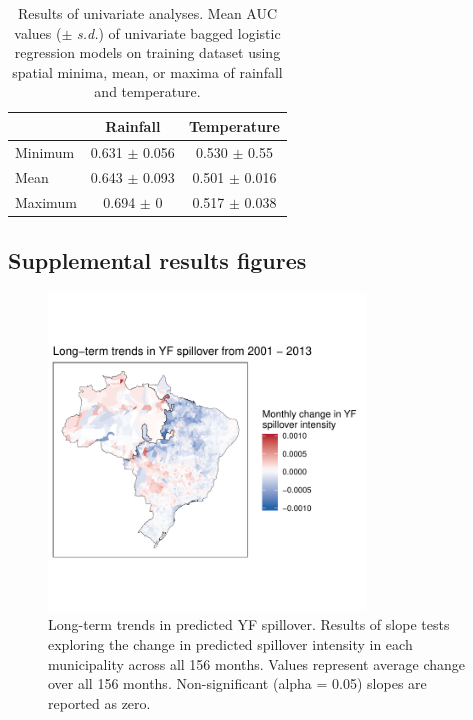 \documentclass{article}
\begin{document}
\begin{table}
\normalsize
\centering
\caption{Results of univariate analyses. Mean AUC values ($\pm$ \textit{s.d.}) of univariate bagged logistic regression models on training dataset using spatial minima, mean, or maxima of rainfall and temperature.}
\label{table:univarateAnalyses}
\begin{tabular}{lcc}
          & Rainfall                     & Temperature                   \\ \hline
Minimum   & 0.631 $\pm$ 0.056              & 0.530 $\pm$ 0.55                          \\
Mean      & 0.643 $\pm$ 0.093              & 0.501 $\pm$ 0.016                         \\
Maximum   & 0.694 $\pm$ 0                  & 0.517 $\pm$ 0.038
\end{tabular}
\begin{flushleft}
\smallskip

\end{flushleft}
\end{table}

\subsection*{Supplemental results figures}

\begin{figure}
\centering
\includegraphics[width=0.75\textwidth]{trendsAcrossSpace_156months}
\caption{Long-term trends in predicted YF spillover. Results of slope tests exploring the change in predicted spillover intensity in each municipality across all 156 months. Values represent average change over all 156 months. Non-significant (alpha = 0.05) slopes are reported as zero.}
\label{trends156}
\end{figure}
\end{document}
